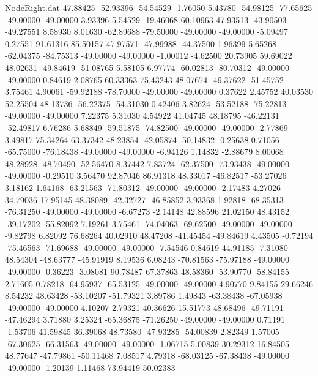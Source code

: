 \begin{filecontents}{NodeRight.dat}
  47.88425  -52.93396  -54.54529    -1.76050    5.43780  -54.98125  -77.65625  -49.00000  -49.00000    3.93396    5.54529  -19.46068   60.10963
  47.93513  -43.90503  -49.27551     8.58930    8.01630  -62.89688  -79.50000  -49.00000  -49.00000   -5.09497    0.27551   91.61316   85.50157
  47.97571  -47.99988  -44.37500     1.96399    5.65268  -62.04375  -84.75313  -49.00000  -49.00000   -1.00012   -4.62500   20.73905   59.69022
  48.02631  -49.84619  -51.08765     5.58105    6.97774  -60.02813  -80.70312  -49.00000  -49.00000    0.84619    2.08765   60.33363   75.43243
  48.07674  -49.37622  -51.45752     3.75461    4.90061  -59.92188  -78.70000  -49.00000  -49.00000    0.37622    2.45752   40.03530   52.25504
  48.13736  -56.22375  -54.31030     0.42406    3.82624  -53.52188  -75.22813  -49.00000  -49.00000    7.22375    5.31030    4.54922   41.04745
  48.18795  -46.22131  -52.49817     6.76286    5.68849  -59.51875  -74.82500  -49.00000  -49.00000   -2.77869    3.49817   75.34264   63.37342
  48.23854  -42.05874  -50.14832    -0.25638    0.71056  -65.75000  -76.18438  -49.00000  -49.00000   -6.94126    1.14832   -2.88679    8.00068
  48.28928  -48.70490  -52.56470     8.37442    7.83724  -62.37500  -73.93438  -49.00000  -49.00000   -0.29510    3.56470   92.87046   86.91318
  48.33017  -46.82517  -53.27026     3.18162    1.64168  -63.21563  -71.80312  -49.00000  -49.00000   -2.17483    4.27026   34.79036   17.95145
  48.38089  -42.32727  -46.85852     3.93368    1.92818  -68.35313  -76.31250  -49.00000  -49.00000   -6.67273   -2.14148   42.88596   21.02150
  48.43152  -39.17202  -55.82092     7.19261    3.75461  -74.04063  -69.62500  -49.00000  -49.00000   -9.82798    6.82092   76.68264   40.02910
  48.47208  -41.45454  -49.84619     4.43505   -0.72194  -75.46563  -71.69688  -49.00000  -49.00000   -7.54546    0.84619   44.91185   -7.31080
  48.54304  -48.63777  -45.91919     8.19536    6.08243  -70.81563  -75.97188  -49.00000  -49.00000   -0.36223   -3.08081   90.78487   67.37863
  48.58360  -53.90770  -58.84155     2.71605    0.78218  -64.95937  -65.53125  -49.00000  -49.00000    4.90770    9.84155   29.66246    8.54232
  48.63428  -53.10207  -51.79321     3.89786    1.49843  -63.38438  -67.05938  -49.00000  -49.00000    4.10207    2.79321   40.36626   15.51773
  48.68496  -49.71191  -47.46294     3.71880    3.25324  -65.36875  -71.26250  -49.00000  -49.00000    0.71191   -1.53706   41.59845   36.39068
  48.73580  -47.93285  -54.00839     2.82349    1.57005  -67.30625  -66.31563  -49.00000  -49.00000   -1.06715    5.00839   30.29312   16.84505
  48.77647  -47.79861  -50.11468     7.08517    4.79318  -68.03125  -67.38438  -49.00000  -49.00000   -1.20139    1.11468   73.94419   50.02383

\end{filecontents}
